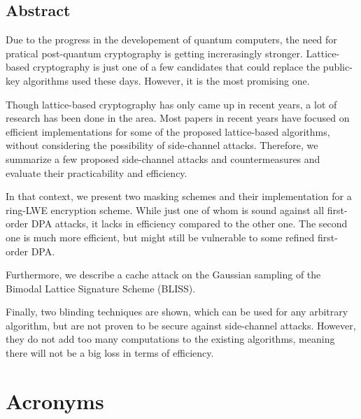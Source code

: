 \documentclass[a4paper,12pt,twoside,openany,headsepline,bibliography=totocnumbered]{scrbook}
\begin{document}


\section*{Abstract}
Due to the progress in the developement of quantum computers, the need for pratical post-quantum cryptography is getting increrasingly stronger. Lattice-based cryptography is just one of a few candidates that could replace the public-key algorithms used these days. However, it is the most promising one.

Though lattice-based cryptography has only came up in recent years, a lot of research has been done in the area. Most papers in recent years have focused on efficient implementations for some of the proposed lattice-based algorithms, without considering the possibility of side-channel attacks. Therefore, we summarize a few proposed side-channel attacks and  countermeasures and evaluate their practicability and efficiency.

In that context, we present two masking schemes and their implementation for a ring-LWE encryption scheme. While just one of whom is sound against all first-order DPA attacks, it lacks in efficiency compared to the other one. The second one is much more efficient, but might still be vulnerable to some refined first-order DPA.

Furthermore, we describe a cache attack on the Gaussian sampling of the Bimodal Lattice Signature Scheme (BLISS).

Finally, two blinding techniques are shown, which can be used for any arbitrary algorithm, but are not proven to be secure against side-channel attacks. However, they do not add too many computations to the existing algorithms, meaning there will not be a big loss in terms of efficiency.
\clearpage

\tableofcontents
\mainmatter

\chapter*{Acronyms}
\begin{acronym}
 	\setlength{\itemsep}{0.2em} 
\end{acronym}
\end{document}

